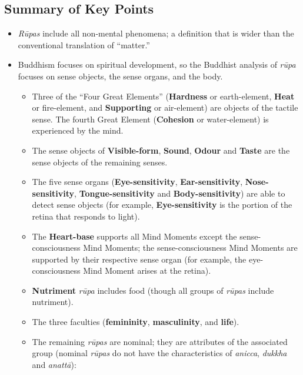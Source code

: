 \pagebreak

\subsection*{Summary of Key Points}

\begin{itemize}

\item \textit{Rūpas} include all non-mental phenomena; a definition that is wider than the conventional translation of “matter.”

\item Buddhism focuses on spiritual development, so the Buddhist analysis of \textit{rūpa} focuses on sense objects, the sense organs, and the body. 

\begin{itemize}

\item Three of the “Four Great Elements” (\textbf{Hardness} or earth-element, \textbf{Heat} or fire-element, and \textbf{Supporting} or air-element) are objects of the tactile sense. The fourth Great Element (\textbf{Cohesion} or water-element) is experienced by the mind.

\item The sense objects of \textbf{Visible-form}, \textbf{Sound}, \textbf{Odour} and \textbf{Taste} are the sense objects of the remaining senses.

\item The five sense organs (\textbf{Eye-sensitivity}, \textbf{Ear-sensitivity}, \textbf{Nose-sensitivity}, \textbf{Tongue-sensitivity} and \textbf{Body-sensitivity}) are able to detect sense objects (for example, \textbf{Eye-sensitivity} is the portion of the retina that responds to light).

\item The \textbf{Heart-base} supports all Mind Moments except the sense-consciousness Mind Moments; the sense-consciousness Mind Moments are supported by their respective sense organ (for example, the eye-consciousness Mind Moment arises at the retina).

\item \textbf{Nutriment} \textit{rūpa} includes food (though all groups of \textit{rūpas} include nutriment).

\item The three faculties (\textbf{femininity}, \textbf{masculinity}, and \textbf{life}).

\item The remaining \textit{rūpas} are nominal; they are attributes of the associated group (nominal \textit{rūpas} do not have the characteristics of \textit{anicca}, \textit{dukkha} and \textit{anattā}):


\end{itemize}
\end{itemize}
